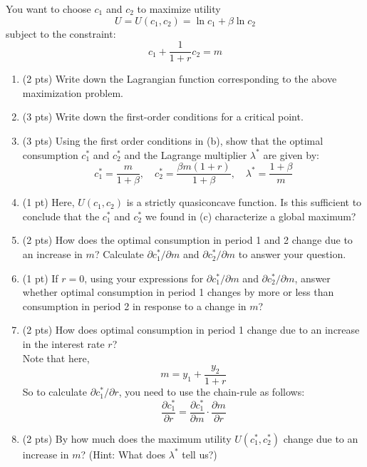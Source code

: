 \documentclass{./../../Latex/tests}
\begin{document}
\begin{enumerate}
\vspace{2em}
You want to choose $c_1$ and $c_2$ to maximize utility $$ U = U(c_1, c_2) =  \ln c_1 + \beta \ln c_2 $$ subject to the constraint:
$$ c_1 + \frac{1}{1+r} c_2 = m $$

\begin{enumerate}
	\item (2 pts) Write down the Lagrangian function corresponding to the above maximization problem. 
\newpage
	\item (3 pts) Write down the first-order conditions for a critical point. 
	\vspace{8cm}
	\item (3 pts) Using the first order conditions in (b), show that the optimal consumption $c_1^*$ and $c_2^*$ and the Lagrange multiplier $\lambda^*$ are given by:
	$$ c_1^* =\frac{m}{1+\beta}, \quad  c_2^* = \frac{\beta m(1+r)}{1+\beta}, \quad \lambda^* = \frac{1+\beta}{m} $$
	\vspace{8cm}
	
	\item (1 pt) Here, $U(c_1, c_2)$ is a strictly quasiconcave function. Is this sufficient to conclude that the $c_1^*$ and $c_2^*$ we found in (c) characterize a global maximum?
	\vspace{3cm}
	\item (2 pts) How does the optimal consumption in period 1 and 2 change due to an increase in $m$? Calculate $\partial c_1^*/\partial m$ and $\partial c_2^*/\partial m$ to answer your question. 
	\vspace{8cm}
	\item (1 pt) If $r=0$, using your expressions for $\partial c_1^*/\partial m$ and $\partial c_2^*/\partial m$, answer whether optimal consumption in period 1 changes by more or less than consumption in period 2 in response to a change in $m$?
	\newpage
	\item (2 pts) How does optimal consumption in period 1 change due to an increase in the interest rate $r$? \\
	
	Note that here, $$ m = y_1 + \frac{y_2}{1+r}  $$
	So to calculate $\partial c_1^*/\partial r$, you need to use the chain-rule as follows:
	$$ \frac{\partial c_1^*}{\partial r} = \frac{\partial c_1^*}{\partial m}\cdot \frac{\partial m}{\partial r}  $$
	\vspace{8cm}
	\item (2 pts) By how much does the maximum utility $U(c^*_1, c^*_2)$ change due to an increase in $m$? (Hint: What does $\lambda^*$ tell us?)
	\end{enumerate}

\end{enumerate}
\end{document}
